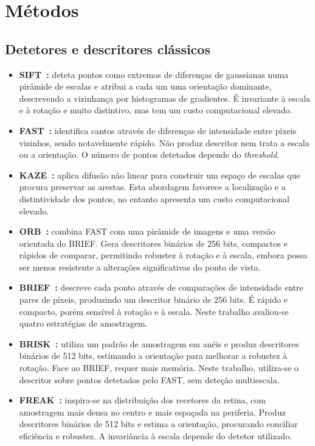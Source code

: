 \documentclass[11pt,a4paper]{article}
\begin{document}
\section{Métodos} 

\subsection{Detetores e descritores clássicos} 

\begin{itemize}

\item \textbf{SIFT~\cite{lowe2004}:} deteta pontos como extremos de diferenças de gaussianas numa pirâmide de escalas e atribui a cada um uma orientação dominante, descrevendo a vizinhança por histogramas de gradientes. É invariante à escala e à rotação e muito distintivo, mas tem um custo computacional elevado.

\item \textbf{FAST~\cite{rosten2006}:} identifica cantos através de diferenças de intensidade entre píxeis vizinhos, sendo notavelmente rápido. Não produz descritor nem trata a escala ou a orientação. O número de pontos detetados depende do \textit{threshold}.

\item \textbf{KAZE~\cite{alcantarilla2012}:} aplica difusão não linear para construir um espaço de escalas que procura preservar as arestas. Esta abordagem favorece a localização e a distintividade dos pontos, no entanto apresenta um custo computacional elevado.

\item \textbf{ORB~\cite{rublee2011}:} combina FAST com uma pirâmide de imagens e uma versão orientada do BRIEF. Gera descritores binários de 256 bits, compactos e rápidos de comparar, permitindo robustez à rotação e à escala, embora possa ser menos resistente a alterações significativas do ponto de vista.

\item \textbf{BRIEF~\cite{calonder2010}:} descreve cada ponto através de comparações de intensidade entre pares de píxeis, produzindo um descritor binário de 256 bits. É rápido e compacto, porém sensível à rotação e à escala. Neste trabalho avaliou-se quatro estratégias de amostragem.

\item \textbf{BRISK~\cite{leutenegger2011}:} utiliza um padrão de amostragem em anéis e produz descritores binários de 512 bits, estimando a orientação para melhorar a robustez à rotação. Face ao BRIEF, requer mais memória. Neste trabalho, utiliza-se o descritor sobre pontos detetados pelo FAST, sem deteção multiescala.

\item \textbf{FREAK~\cite{alahi2012}:} inspira-se na distribuição dos recetores da retina, com amostragem mais densa no centro e mais espaçada na periferia. Produz descritores binários de 512 bits e estima a orientação, procurando conciliar eficiência e robustez. A invariância à escala depende do detetor utilizado.

\end{itemize}
\end{document}
